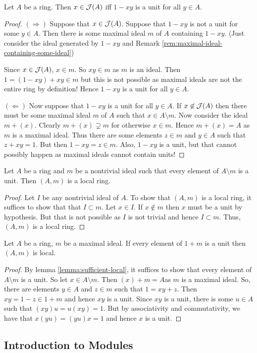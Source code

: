 \begin{lemma}
    Let $A$ be a ring. Then $x\in {\cal J} (A)$ iff $1-xy$ is a unit for all $y\in A$.
    \label{lemma:equiv-Jacobson}
\end{lemma}
\begin{proof}
    $\left( \Longrightarrow \right)$ Suppose that $x \in {\cal J}(A)$. Suppose that $1-xy$ is not a unit for some $y\in A$. Then there is some maximal ideal $m$ of $A$ containing $1-xy$. (Just consider the ideal generated by $1-xy$ and Remark \ref{rem:maximal-ideal-containing-some-ideal})

    Since $x\in {\cal J}(A)$, $x\in m$. So $xy\in m$ as $m$ is an ideal. Then $1= (1-xy)+xy \in m$ but this is not possible as maximal ideals are not the entire ring by definition! Hence $1-xy $ is a unit for all $y\in A$.

    $\left( \Longleftarrow \right)$ Now suppose that $1-xy$ is a unit for all $y\in A$. If $x\not \in {\cal J} (A)$ then there must be some maximal ideal $m$ of $A$ such that $x\in A\setminus m$. Now consider the ideal $m + (x)$. Clearly $m + (x) \supsetneq m$ for otherwise $x\in m$. Hence $m+ (x)=A$ as $m$ is a maximal ideal. Thus there are some elements $z\in m$ and $y \in A$ such that $z+xy =1$. But then $1-xy = z \in m$. Also, $1-xy$ is a unit, but that cannot possibly happen as maximal ideals cannot contain units!
\end{proof}

\begin{lemma}
    Let $A$ be a ring and $m$ be a nontrivial ideal such that every element of $A\setminus m$ is a unit. Then $\left( A, m \right)$ is a local ring.
    \label{lemma:sufficient-local}
\end{lemma}
\begin{proof}
    Let $I$ be any nontrivial ideal of $A$. To show that $\left( A,m \right)$ is a local ring, it suffices to show that that $I \subset m$. Let $x\in I$. If $x\not \in m$ then $x$ must be a unit by hypothesis. But that is not possible as $I$ is not trivial and hence $I \subset m$. Thus, $(A, m)$ is a local ring.
\end{proof}

\begin{lemma}
    Let $A$ be a ring, $m$ be a maximal ideal. If every element of $1+m$ is a unit then $(A,m)$ is local.
    \label{lemma:sufficient-local-2}
\end{lemma}
\begin{proof}
    By lemma \ref{lemma:sufficient-local}, it suffices to show that every element of $A\setminus m$ is a unit. So let $x\in A \setminus m$. Then $\left( x \right) + m = A $as $m$ is a maximal ideal. So, there are elements $y\in A$ and $z\in m$ such that $1=xy+z$. Then $xy = 1-z \in 1+m$ and hence $xy$ is a unit. Since $xy$ is a unit, there is some $u \in A$ such that $(xy)u= u(xy)=1$. But by associativity and commutativity, we have that $x(yu)=(yu)x=1$ and hence $x$ is a unit.
\end{proof} 

\subsection{Introduction to Modules}
